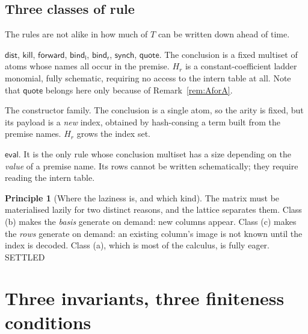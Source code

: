 \documentclass[11pt,a4paper]{article}
\theoremstyle{plain}
\theoremstyle{definition}
\newtheorem{principle}[theorem]{Principle}
\theoremstyle{remark}
\begin{document}
\subsection{Three classes of rule}
\label{sec:classes}

The rules are not alike in how much of $T$ can be written down ahead of
time.

\begin{description}[leftmargin=2.2em,style=nextline]
\item[Class (a), seven rules: permutation of existing indices.]
  $\mathsf{dist}$, $\mathsf{kill}$, $\mathsf{forward}$, $\mathsf{bind_l}$,
  $\mathsf{bind_r}$, $\mathsf{synch}$, $\mathsf{quote}$. The conclusion is a
  fixed multiset of atoms whose names all occur in the premise. $H_r$ is a
  constant-coefficient ladder monomial, fully schematic, requiring no access
  to the intern table at all. Note that $\mathsf{quote}$ belongs here only
  because of Remark~\ref{rem:AforA}.
\item[Class (b), one rule per constructor: encode.] The constructor family.
  The conclusion is
  a single atom, so the arity is fixed, but its payload is a \emph{new} index,
  obtained by hash-consing a term built from the premise names. $H_r$ grows
  the index set.
\item[Class (c), one rule: decode.] $\mathsf{eval}$. It is the only rule whose
  conclusion multiset has a size depending on the \emph{value} of a premise
  name. Its rows cannot be written schematically; they require reading the
  intern table.
\end{description}

\begin{principle}[Where the laziness is, and which kind]
\label{prin:lazy}
The matrix must be materialised lazily for two distinct reasons, and the
lattice separates them. Class (b) makes the \emph{basis} generate on demand:
new columns appear. Class (c) makes the \emph{rows} generate on demand: an
existing column's image is not known until the index is decoded. Class (a),
which is most of the calculus, is fully eager. \textsf{SETTLED}
\end{principle}

\section{Three invariants, three finiteness conditions}
\label{sec:three}
\end{document}
